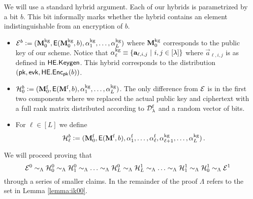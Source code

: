 We will use a standard hybrid argument. Each of our hybrids is parametrized by a bit $b$. This bit informally marks whether the hybrid contains an element indistinguishable from an encryption of $b$.
\begin{itemize}

\item $\mathcal{E}^b \vcentcolon= (\mathbf{M}^{\text{kg}}_0, \mathsf{E}(\mathbf{M}^{\text{kg}}_0, b), \mathbf{\alpha}^{\text{kg}}_1, \dots, \mathbf{\alpha}^{\text{kg}}_L) $ where 
$\mathbf{M}^{\text{kg}}_0$ corresponds to the public key of our scheme.
Notice that $\mathbf{\alpha}^{\text{kg}}_{\ell} \equiv \{ \mathbf{a}_{\ell, i, j} \ | \ i,j \in [\lambda] \}$ where $ \vec{a}_{\ell, i, j}$ is as defined in $\mathsf{HE.Keygen}$. This hybrid corresponds to the distribution $(\mathsf{pk},\mathsf{evk}, \mathsf{HE.Enc}_{\mathsf{pk}}(b))$.
\item $\mathcal{H}^b_0 \vcentcolon= (\mathbf{M}^{\mathcal{\text{f}}}_0, \mathsf{E}(\mathbf{M}^{\mathcal{\text{f}}}, b), \mathbf{\alpha}^{\text{kg}}_1, \dots, \mathbf{\alpha}^{\text{kg}}_L)$. The only difference from $\mathcal{E}$ is in the first two components where we replaced the actual public key and ciphertext with a full rank matrix distributed according to $\mathcal{D}^{\text{f}}_{\lambda}$ and a random vector of bits.
\item For $\ell \in [L]$ we define
\[
\mathcal{H}^b_{\ell} \vcentcolon= (\mathbf{M}^{\mathcal{\text{f}}}_0, \mathsf{E}(\mathbf{M}^{\mathcal{\text{f}}}, b), \mathbf{\alpha}^{\text{f}}_1, \dots, \mathbf{\alpha}^{\text{f}}_{\ell}, \mathbf{\alpha}^{\text{kg}}_{\ell+1}, \dots, \mathbf{\alpha}^{\text{kg}}_L) \, .
\]
\end{itemize}

We will proceed proving that
\[
\hEz \lind \hHz_0 \lind \hHz_1 \lind \dots \lind \hHz_L \lind \hH^1_L \lind \dots \lind \hH^1_1 \lind \hH^1_0 \lind \hE^1
\]
through a series of smaller claims. In the remainder of the proof $\Lambda$ refers to the set in Lemma \ref{lemma:ik00}.

